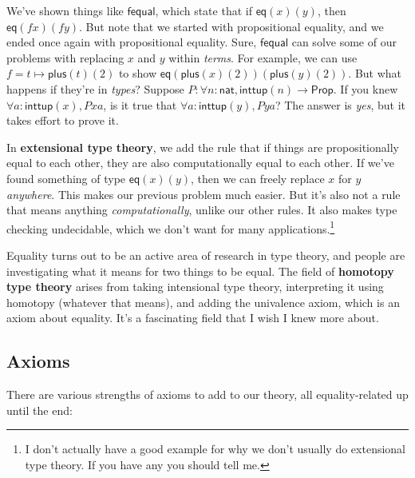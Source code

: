 \documentclass[11pt,paper=letter]{scrartcl}
\renewcommand{\sf}{\mathsf}
\newcommand{\prop}{\mathsf{Prop}}
\begin{document}
We've shown things like $\sf{fequal}$, which state that if $\sf{eq}(x)(y)$, then $\sf{eq}(fx)(fy)$. But note that we started with propositional equality, and we ended once again with propositional equality. Sure, $\sf{fequal}$ can solve some of our problems with replacing $x$ and $y$ within \emph{terms}. For example, we can use $f = t \mapsto \sf{plus}(t)(2)$ to show $\sf{eq}(\sf{plus}(x)(2))(\sf{plus}(y)(2))$. But what happens if they're in \emph{types}? Suppose $P: \forall n: \sf{nat}, \sf{inttup}(n) \to \prop$. If you knew $\forall a: \sf{inttup}(x), Pxa$, is it true that $\forall a: \sf{inttup}(y), Pya$? The answer is \emph{yes}, but it takes effort to prove it.

In \textbf{extensional type theory}, we add the rule that if things are propositionally equal to each other, they are also computationally equal to each other. If we've found something of type $\sf{eq}(x)(y)$, then we can freely replace $x$ for $y$ \emph{anywhere}. This makes our previous problem much easier. But it's also not a rule that means anything \emph{computationally}, unlike our other rules. It also makes type checking undecidable, which we don't want for many applications.\footnote{I don't actually have a good example for why we don't usually do extensional type theory. If you have any you should tell me.}

Equality turns out to be an active area of research in type theory, and people are investigating what it means for two things to be equal. The field of \textbf{homotopy type theory} arises from taking intensional type theory, interpreting it using homotopy (whatever that means), and adding the univalence axiom, which is an axiom about equality. It's a fascinating field that I wish I knew more about.

\subsection{Axioms}

There are various strengths of axioms to add to our theory, all equality-related up until the end:
\end{document}
